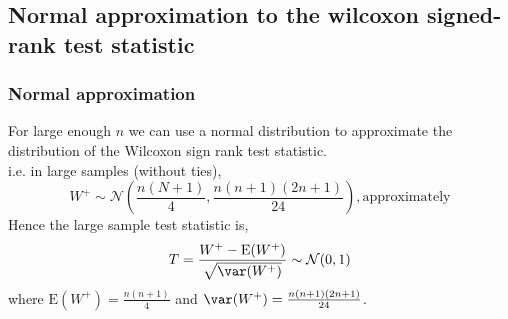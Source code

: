 \documentclass[a4paper]{article}
\begin{document}
\subsection{Normal approximation to the wilcoxon signed-rank test statistic}
\subsubsection{Normal approximation}
For \textcolor{myred}{large enough} \( n \) we can use a normal distribution to approximate the distribution of the Wilcoxon sign rank test statistic.\\
i.e. in large samples (without ties),
\[
	W^+ \sim \mathcal{N} \left( \frac{n(N+1)}{4}, \frac{n(n+1)(2n+1)}{24} \right), \text{approximately}
\]
Hence the large sample test statistic is,
\[
	T = \frac{W^+ - \mathrm{E}(W^+)}{\sqrt{\var(W^+)}} \sim \mathcal{N}(0,1)
\]
where \( \mathrm{E}(W^+) = \frac{n(n+1)}{4} \) and \( \var(W^+) = \frac{n(n+1)(2n+1)}{24} \).  
\end{document}
